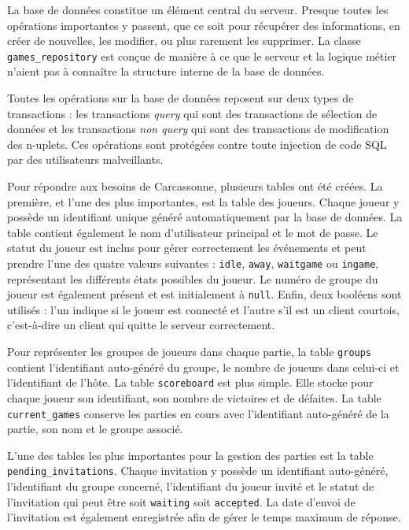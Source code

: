 \documentclass[11pt]{article}
\begin{document}
La base de données constitue un élément central du serveur. Presque toutes les opérations importantes y passent, que ce soit pour récupérer des informations, en créer de nouvelles, les modifier, ou plus rarement les supprimer. La classe \texttt{games\_repository} est conçue de manière à ce que le serveur et la logique métier n'aient pas à connaître la structure interne de la base de données.

Toutes les opérations sur la base de données reposent sur deux types de transactions : les transactions \textit{query} qui sont des transactions de sélection de données et les transactions \textit{non query} qui sont des transactions de modification des n-uplets. Ces opérations sont protégées contre toute injection de code SQL par des utilisateurs malveillants.

Pour répondre aux besoins de Carcassonne, plusieurs tables ont été créées. La première, et l'une des plus importantes, est la table des joueurs. Chaque joueur y possède un identifiant unique généré automatiquement par la base de données. La table contient également le nom d'utilisateur principal et le mot de passe. Le statut du joueur est inclus pour gérer correctement les événements et peut prendre l'une des quatre valeurs suivantes : \texttt{idle}, \texttt{away}, \texttt{waitgame} ou \texttt{ingame}, représentant les différents états possibles du joueur. Le numéro de groupe du joueur est également présent et est initialement à \texttt{null}. Enfin, deux booléens sont utilisés : l'un indique si le joueur est connecté et l'autre s'il est un client courtois, c'est-à-dire un client qui quitte le serveur correctement.

Pour représenter les groupes de joueurs dans chaque partie, la table \texttt{groups} contient l'identifiant auto-généré du groupe, le nombre de joueurs dans celui-ci et l'identifiant de l'hôte. La table \texttt{scoreboard} est plus simple. Elle stocke pour chaque joueur son identifiant, son nombre de victoires et de défaites. La table \texttt{current\_games} conserve les parties en cours avec l'identifiant auto-généré de la partie, son nom et le groupe associé.

L'une des tables les plus importantes pour la gestion des parties est la table \texttt{pending\_invitations}. Chaque invitation y possède un identifiant auto-généré, l'identifiant du groupe concerné, l'identifiant du joueur invité et le statut de l'invitation qui peut être soit \texttt{waiting} soit \texttt{accepted}. La date d'envoi de l'invitation est également enregistrée afin de gérer le temps maximum de réponse.
\end{document}
